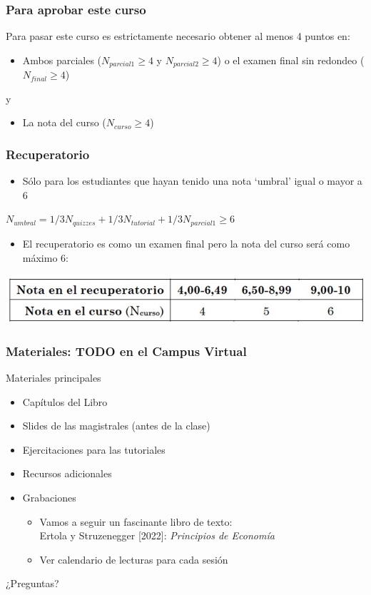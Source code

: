 \documentclass{beamer}
\begin{document}
\begin{frame}
\frametitle{Para aprobar este curso}
Para pasar este curso es estrictamente necesario obtener al menos 4 puntos en:
\vspace{2mm}
\begin{itemize}
    \item Ambos parciales ($N_{parcial 1} \geq 4$ y $N_{parcial 2} \geq 4$) o el examen final sin redondeo ($N_{final} \geq 4$)
\end{itemize}
\centering y
\vspace{2mm}
\begin{itemize}
    \item La nota del curso ($N_{curso} \geq 4$)
\end{itemize}
\end{frame}

\begin{frame}
\frametitle{Recuperatorio}
\begin{itemize}
    \item Sólo para los estudiantes que hayan tenido una nota ‘umbral’ igual o mayor a 6
\end{itemize}
    \begin{center}
        $N_{umbral}=1/3N_{quizzes}+1/3N_{tutorial}+1/3N_{parcial 1} \geq 6$
    \end{center}
    
\begin{itemize}
    \item El recuperatorio es como un examen final pero la nota del curso será como máximo 6:
\end{itemize}
\centering
\includegraphics[scale=0.6]{../Figures/notarecup.jpg}

\end{frame}

\begin{frame}
\frametitle{Materiales: TODO en el Campus Virtual}
Materiales principales
\begin{itemize}
    \item Capítulos del Libro
    \item Slides de las magistrales (antes de la clase)
    \item Ejercitaciones para las tutoriales
    \item Recursos adicionales
    \item Grabaciones
    \begin{itemize}
        \item Vamos a seguir un fascinante libro de texto: \\
        Ertola y Struzenegger [2022]:  \textit{Principios de Economía}
        \item Ver calendario de lecturas para cada sesión
        \end{itemize}
\end{itemize}
\end{frame}


\begin{frame}
\begin{center}
    \Huge ¿Preguntas?
\end{center}
\end{frame}
\end{document}
